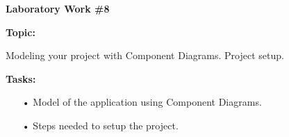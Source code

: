 \graphicspath{ {pic/} }
\begin{flushleft}
\setlength{\parindent}{2ex}\par
\textbf{Laboratory Work \#8} \par
\textbf{Topic:}\par
Modeling your project with Component Diagrams. Project setup.
\par
\textbf{Tasks:}
\begin{enumerate}
\item[•] Model of the application using Component Diagrams.
\item[•] Steps needed to setup the project.
\end{enumerate}
\end{flushleft}
\clearpage
